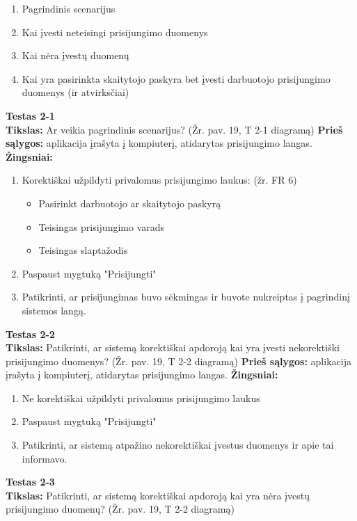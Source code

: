 \documentclass{VUMIFPSkursinis}
\begin{document}
\begin{enumerate}
\item Pagrindinis scenarijus
\item Kai įvesti neteisingi prisijungimo duomenys
\item Kai nėra įvestų duomenų
\item Kai yra pasirinkta skaitytojo paskyra bet įvesti darbuotojo prisijungimo duomenys (ir atvirksčiai)
\end{enumerate}
\hfill \break
\textbf{Testas 2-1}\\
\hfill \break
\textbf{Tikslas:} Ar veikia pagrindinis scenarijus? (Žr. pav. 19, T 2-1 diagramą)
\hfill \break
\hfill \break
\textbf{Prieš sąlygos:} aplikacija įrašyta į kompiuterį, atidarytas prisijungimo langas.
\hfill \break
\hfill \break
\textbf{Žingsniai:}
\hfill \break
\begin{enumerate}
\item Korektiškai užpildyti privalomus prisijungimo laukus: (žr. FR 6)
\begin{itemize}
\item Pasirinkt darbuotojo ar skaitytojo paskyrą
\item Teisingas prisijungimo varads
\item Teisingas slaptažodis
\end{itemize}
\item Paspaust mygtuką "Prisijungti"
\item Patikrinti, ar prisijungimas buvo sėkmingas ir buvote nukreiptas į pagrindinį sistemos langą.
\end{enumerate}
\hfill \break
\textbf{Testas 2-2}\\
\hfill \break
\textbf{Tikslas:} Patikrinti, ar sistemą korektiškai apdoroją kai yra įvesti nekorektiški prisijungimo duomenys? (Žr. pav. 19, T 2-2 diagramą)
\hfill \break
\hfill \break
\textbf{Prieš sąlygos:} aplikacija įrašyta į kompiuterį, atidarytas prisijungimo langas.
\hfill \break
\hfill \break
\textbf{Žingsniai:}
\hfill \break
\begin{enumerate}
\item Ne korektiškai užpildyti privalomus prisijungimo laukus
\item Paspaust mygtuką "Prisijungti"
\item Patikrinti, ar sistemą atpažino nekorektiškai įvestus duomenys ir apie tai informavo.
\end{enumerate}
\hfill \break
\textbf{Testas 2-3}\\
\hfill \break
\textbf{Tikslas:} Patikrinti, ar sistemą korektiškai apdoroją kai yra nėra įvestų prisijungimo duomenų? (Žr. pav. 19, T 2-2 diagramą)
\end{document}

